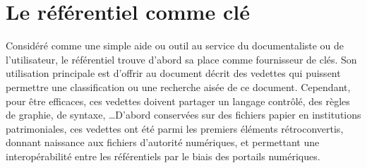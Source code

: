 \chapter{\label{I-A}Le référentiel comme clé}

Considéré comme une simple aide ou outil au service du documentaliste ou de l'utilisateur, le référentiel trouve d'abord sa place comme fournisseur de clés. Son utilisation principale est d'offrir au document décrit des vedettes qui puissent permettre une classification ou une recherche aisée de ce document. Cependant, pour être efficaces, ces vedettes doivent partager un langage contrôlé, des règles de graphie, de syntaxe, \dots D'abord conservées sur des fichiers papier en institutions patrimoniales, ces vedettes ont été parmi les premiers éléments rétroconvertis, donnant naissance aux fichiers d'autorité numériques, et permettant une interopérabilité entre les référentiels par le biais des portails numériques.







